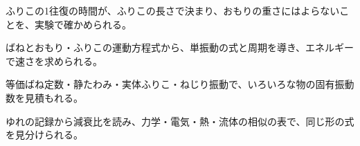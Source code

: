 \begin{furikaeri}
\begin{checklist}
\item ふりこの1往復の時間が、ふりこの長さで決まり、おもりの重さにはよらないことを、実験で確かめられる。
\item ばねとおもり・ふりこの運動方程式から、単振動の式と周期を導き、エネルギーで速さを求められる。
\item 等価ばね定数・静たわみ・実体ふりこ・ねじり振動で、いろいろな物の固有振動数を見積もれる。
\item ゆれの記録から減衰比を読み、力学・電気・熱・流体の相似の表で、同じ形の式を見分けられる。
\end{checklist}
\end{furikaeri}
